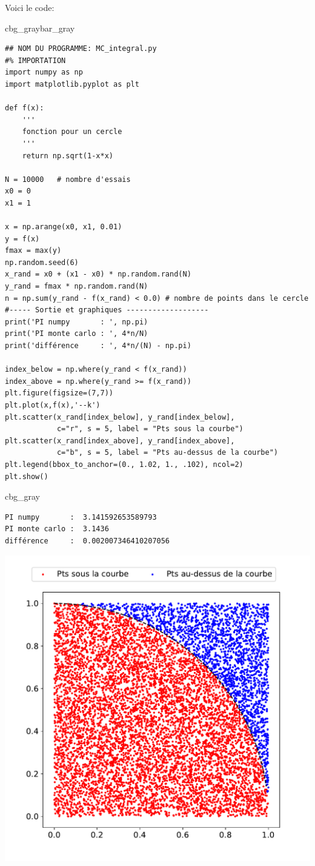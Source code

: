 \documentclass[%
oneside,                 %
final,                   %
10pt]{article}
\newenvironment{_cod_tight}[1]{
   \def\FrameCommand{\colorbox{#1}}
   \FrameRule0.6pt\MakeFramed {\FrameRestore}\vskip3mm}
   {\vskip0mm\endMakeFramed}
\newenvironment{cod}[1]{
\bgroup\rmfamily
\fboxsep=0mm\relax
\begin{_cod_tight}{#1}
\list{}{\parsep=-2mm\parskip=0mm\topsep=0pt\leftmargin=2mm
\rightmargin=2\leftmargin\leftmargin=4pt\relax}
\item\relax}
{\endlist\end{_cod_tight}\egroup}
\newenvironment{_pro_tight}[2]{
   \def\FrameCommand{\color{#2}\vrule width 1mm\normalcolor\colorbox{#1}}
   \FrameRule0.6pt\MakeFramed {\advance\hsize-2mm\FrameRestore}\vskip3mm}
   {\vskip0mm\endMakeFramed}
\newenvironment{pro}[2]{
\bgroup\rmfamily
\fboxsep=0mm\relax
\begin{_pro_tight}{#1}{#2}
\list{}{\parsep=-2mm\parskip=0mm\topsep=0pt\leftmargin=2mm
\rightmargin=2\leftmargin\leftmargin=4pt\relax}
\item\relax}
{\endlist\end{_pro_tight}\egroup}
\begin{document}
Voici le code:

\begin{pro}{cbg_gray}{bar_gray}\begin{verbatim}
## NOM DU PROGRAMME: MC_integral.py
#% IMPORTATION
import numpy as np
import matplotlib.pyplot as plt

def f(x):
    '''
    fonction pour un cercle
    '''
    return np.sqrt(1-x*x)

N = 10000   # nombre d'essais
x0 = 0
x1 = 1

x = np.arange(x0, x1, 0.01)
y = f(x)
fmax = max(y)
np.random.seed(6)
x_rand = x0 + (x1 - x0) * np.random.rand(N)
y_rand = fmax * np.random.rand(N)
n = np.sum(y_rand - f(x_rand) < 0.0) # nombre de points dans le cercle
#----- Sortie et graphiques -------------------
print('PI numpy       : ', np.pi)
print('PI monte carlo : ', 4*n/N)
print('différence     : ', 4*n/(N) - np.pi)

index_below = np.where(y_rand < f(x_rand))
index_above = np.where(y_rand >= f(x_rand))
plt.figure(figsize=(7,7))
plt.plot(x,f(x),'--k')
plt.scatter(x_rand[index_below], y_rand[index_below],
            c="r", s = 5, label = "Pts sous la courbe")
plt.scatter(x_rand[index_above], y_rand[index_above],
            c="b", s = 5, label = "Pts au-dessus de la courbe")
plt.legend(bbox_to_anchor=(0., 1.02, 1., .102), ncol=2)
plt.show()
\end{verbatim}
\end{pro}
\noindent
\begin{cod}{cbg_gray}\begin{verbatim}
PI numpy       :  3.141592653589793
PI monte carlo :  3.1436
différence     :  0.002007346410207056
\end{verbatim}
\end{cod}
\noindent


\vspace{6mm}

\centerline{\includegraphics[width=0.7\linewidth]{imgs/MC_integral.pdf}}
\end{document}
